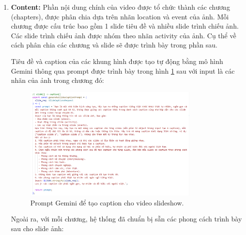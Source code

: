 \begin{enumerate}
    \item \textbf{Content:}\newline
    Phần nội dung chính của video được tổ chức thành các chương (chapters), được phân chia dựa trên nhãn location và event của ảnh. Mỗi chương được cấu trúc bao gồm 1 slide tiêu đề và nhiều slide trình chiếu ảnh. Các slide trình chiếu ảnh được nhóm theo nhãn activity của ảnh. Cụ thể về cách phân chia các chương và slide sẽ được trình bày trong phần sau.
    
    Tiêu đề và caption của các khung hình được tạo tự động bằng mô hình Gemini thông qua prompt được trình bày trong hình \ref{fig:gemini-prompt} sau với input là các nhãn của ảnh trong chương đó:
    
    \begin{figure}[H]
        \centering  
        \includegraphics[width=0.82\textwidth]{figures/c4/4_1/prompt.png}
        \caption{Prompt Gemini để tạo caption cho video slideshow.}
        \label{fig:gemini-prompt}
    \end{figure}
    
    \newpage
    Ngoài ra, với mỗi chương, hệ thống đã chuẩn bị sẵn các phong cách trình bày sau cho slide ảnh:


\end{enumerate}
